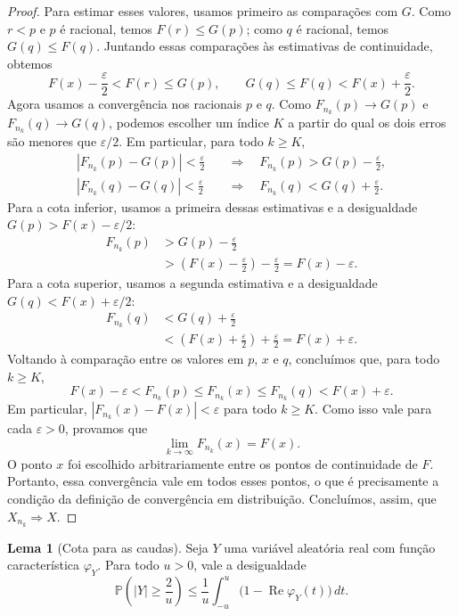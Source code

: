\documentclass[12pt,portuguese]{article}
\theoremstyle{definition}
\newtheorem{lemma}[lemma]{Lema}
\theoremstyle{plainexercise}
\theoremstyle{starredexercise}
\theoremstyle{definition}
\begin{document}
\begin{proof}
Para estimar esses valores, usamos primeiro as comparações com $G$.
Como $r<p$ e $p$ é racional, temos $F(r)\leqslant G(p)$; como $q$ é
racional, temos $G(q)\leqslant F(q)$. Juntando essas comparações às
estimativas de continuidade, obtemos
\[
F(x)-\frac{\varepsilon}{2}<F(r)\leqslant G(p),
\qquad
G(q)\leqslant F(q)<F(x)+\frac{\varepsilon}{2}.
\]
Agora usamos a convergência nos racionais $p$ e $q$. Como
$F_{n_k}(p)\to G(p)$ e $F_{n_k}(q)\to G(q)$, podemos escolher um índice
$K$ a partir do qual os dois erros são menores que $\varepsilon/2$.
Em particular, para todo $k\geqslant K$,
\begin{align*}
|F_{n_k}(p)-G(p)|<\frac{\varepsilon}{2}
&\quad\Longrightarrow\quad
F_{n_k}(p)>G(p)-\frac{\varepsilon}{2},\\[0.2cm]
|F_{n_k}(q)-G(q)|<\frac{\varepsilon}{2}
&\quad\Longrightarrow\quad
F_{n_k}(q)<G(q)+\frac{\varepsilon}{2}.
\end{align*}
Para a cota inferior, usamos a primeira dessas estimativas e a desigualdade
$G(p)>F(x)-\varepsilon/2$:
\begin{align*}
F_{n_k}(p)
&>G(p)-\frac{\varepsilon}{2}\\[0.2cm]
&>\left(F(x)-\frac{\varepsilon}{2}\right)-\frac{\varepsilon}{2}
=F(x)-\varepsilon.
\end{align*}
Para a cota superior, usamos a segunda estimativa e a desigualdade
$G(q)<F(x)+\varepsilon/2$:
\begin{align*}
F_{n_k}(q)
&<G(q)+\frac{\varepsilon}{2}\\[0.2cm]
&<\left(F(x)+\frac{\varepsilon}{2}\right)+\frac{\varepsilon}{2}
=F(x)+\varepsilon.
\end{align*}
Voltando à comparação entre os valores em $p$, $x$ e $q$, concluímos que,
para todo $k\geqslant K$,
\[
F(x)-\varepsilon<F_{n_k}(p)\leqslant F_{n_k}(x)
\leqslant F_{n_k}(q)<F(x)+\varepsilon.
\]
Em particular, $|F_{n_k}(x)-F(x)|<\varepsilon$ para todo $k\geqslant K$.
Como isso vale para cada $\varepsilon>0$, provamos que
\[
\lim_{k\to\infty}F_{n_k}(x)=F(x).
\]
O ponto $x$ foi escolhido arbitrariamente entre os pontos de continuidade
de $F$. Portanto, essa convergência vale em todos esses pontos, o que é
precisamente a condição da definição de convergência em distribuição.
Concluímos, assim, que $X_{n_k}\Rightarrow X$.
\end{proof}

\begin{lemma}[Cota para as caudas]\label{lem:cota-cauda-fc}
Seja $Y$ uma variável aleatória real com função característica $\varphi_Y$.
Para todo $u>0$, vale a desigualdade
\begin{equation}\label{eq:cota-concentracao}
\mathbb{P}\left( |Y| \geqslant  \frac{2}{u} \right)
\leqslant
\frac{1}{u}\int_{-u}^{u}
\bigl(1-\operatorname{Re}\varphi_Y(t)\bigr)\,dt.
\end{equation}
\end{lemma}
\end{document}
